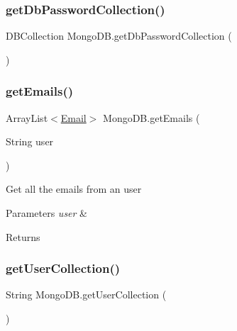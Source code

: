 \subsubsection{\texorpdfstring{get\+Db\+Password\+Collection()}{getDbPasswordCollection()}}
{\footnotesize\ttfamily D\+B\+Collection Mongo\+D\+B.\+get\+Db\+Password\+Collection (\begin{DoxyParamCaption}{ }\end{DoxyParamCaption})}

\mbox{\label{class_mongo_d_b_afb31e6d36e9b20ceff3f13901bfc4012}} 
\subsubsection{\texorpdfstring{get\+Emails()}{getEmails()}}
{\footnotesize\ttfamily Array\+List$<$\hyperlink{class_email}{Email}$>$ Mongo\+D\+B.\+get\+Emails (\begin{DoxyParamCaption}\item[{String}]{user }\end{DoxyParamCaption})}

Get all the emails from an user 
\begin{DoxyParams}{Parameters}
{\em user} & \\
\hline
\end{DoxyParams}
\begin{DoxyReturn}{Returns}

\end{DoxyReturn}
\mbox{\label{class_mongo_d_b_adf1dfa43d61be69c1673bb8ddfeb210e}} 
\subsubsection{\texorpdfstring{get\+User\+Collection()}{getUserCollection()}}
{\footnotesize\ttfamily String Mongo\+D\+B.\+get\+User\+Collection (\begin{DoxyParamCaption}{ }\end{DoxyParamCaption})}

\mbox{\label{class_mongo_d_b_a2e376b333a71c82b5dd8e054d538e7f4}} 

